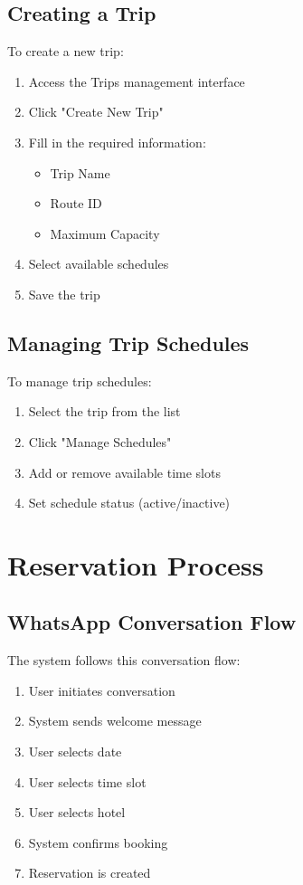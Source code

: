 \subsection{Creating a Trip}
To create a new trip:
\begin{enumerate}
    \item Access the Trips management interface
    \item Click "Create New Trip"
    \item Fill in the required information:
        \begin{itemize}
            \item Trip Name
            \item Route ID
            \item Maximum Capacity
        \end{itemize}
    \item Select available schedules
    \item Save the trip
\end{enumerate}

\subsection{Managing Trip Schedules}
To manage trip schedules:
\begin{enumerate}
    \item Select the trip from the list
    \item Click "Manage Schedules"
    \item Add or remove available time slots
    \item Set schedule status (active/inactive)
\end{enumerate}

\section{Reservation Process}

\subsection{WhatsApp Conversation Flow}
The system follows this conversation flow:
\begin{enumerate}
    \item User initiates conversation
    \item System sends welcome message
    \item User selects date
    \item User selects time slot
    \item User selects hotel
    \item System confirms booking
    \item Reservation is created
\end{enumerate}

